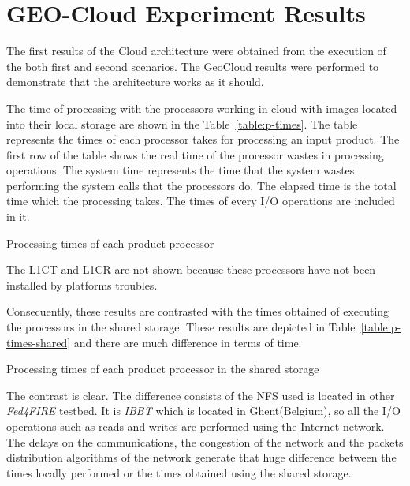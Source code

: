 \section{GEO-Cloud Experiment Results}
\label{sec:geocloud-results}

The first results of the Cloud architecture were obtained from the execution of
the both first and second scenarios. The GeoCloud results were performed to
demonstrate that the architecture works as it should. 

The time of processing with the processors working in cloud with images located
into their local storage are shown in the Table~\ref{table:p-times}. The table
represents the times of each processor takes for processing an input
product. The first row of the table shows the real time of the processor wastes
in processing operations. The system time represents the time that the system
wastes performing the system calls that the processors do. The elapsed time is
the total time which the processing takes. The times of every I/O operations are
included in it.   

\begin{table}[!h]
  \centering
  {\small
  
  }
  \caption{Processing times of each product processor}
  \label{table:p-times}
\end{table}

The L1CT and L1CR are not shown because these processors have not been installed
by platforms troubles.

Consecuently, these results are contrasted with the times obtained of executing
the processors in the shared storage. These results are depicted in Table~\ref{table:p-times-shared}
and there are much difference in terms of time.

\begin{table}[!h]
  \centering
  {\small
  
  }
  \caption{Processing times of each product processor in the shared storage}
  \label{table:p-times-shared}
\end{table}


The contrast is clear. The difference consists of the \ac{NFS} used is located
in other \emph{Fed4FIRE} testbed. It is \emph{IBBT} which is located in
Ghent(Belgium), so all the I/O operations such as reads and writes are performed
using the Internet network. The delays on the communications, the congestion of
the network and the packets distribution algorithms of the network generate that
huge difference between the times locally performed or the times obtained using
the shared storage.

